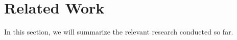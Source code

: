 \section{Related Work}
\label{related_work}

In this section, we will summarize the relevant research conducted so far.

\vspace{1mm}
\noindent


